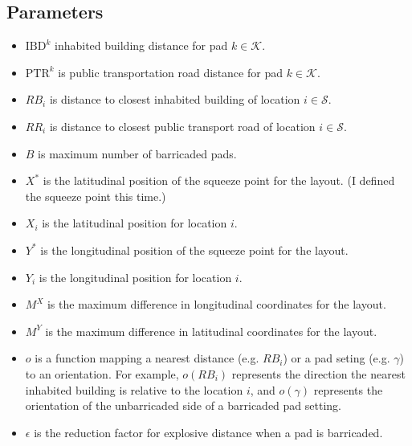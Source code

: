 \documentclass[10pt]{article}
\newcommand{\seancomm}[1]{{\color{blue} #1}}
\begin{document}
	\subsection{Parameters}
	\begin{itemize}
		\item $\text{IBD}^k$ inhabited building distance for pad $ k \in \mathcal{K}$.
		\item $\text{PTR}^k$ is public transportation road distance for pad $ k \in \mathcal{K}$.
		\item $ RB_i $ is distance to closest inhabited building of location $i \in \mathcal{S}$.
		\item $ RR_i $ is distance to closest public transport road of location $i \in \mathcal{S}$.
		\item $ B $ is maximum number of barricaded pads.
		\item $ X^* $ is the latitudinal position of the squeeze point for the layout. \seancomm{(I defined the squeeze point this time.)}
		\item $ X_i $ is the latitudinal position for location $ i $.
		\item $ Y^* $ is the longitudinal position of the squeeze point for the layout.
		\item $ Y_i $ is the longitudinal position for location $ i $.
		\item $ M^X $ is the maximum difference in longitudinal coordinates for the layout.
		\item $ M^Y $ is the maximum difference in latitudinal coordinates for the layout.
		\item $ o $ is a function mapping a nearest distance (e.g. $ RB_i $) or a pad seting (e.g. $ \gamma $) to an orientation. For example, $ o(RB_i) $ represents the direction the nearest inhabited building is relative to the location $ i $, and $ o(\gamma) $ represents the orientation of the unbarricaded side of a barricaded pad setting.
		\item $ \epsilon $ is the reduction factor for explosive distance when a pad is barricaded.
	\end{itemize}
	
\end{document}
